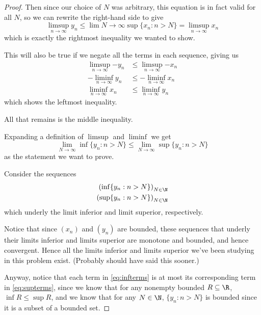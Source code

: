 \documentclass[11pt,letterpaper]{article}
\begin{document}
\begin{proof}
  Then since our choice of $N$ was arbitrary, this equation is in fact valid
  for all $N$, so we can rewrite the right-hand side to give
  \begin{equation*}
    \limsup_{n\to\infty} {y_n}
    \leq \lim{N\to\infty} \sup \{ x_n : n > N \}
    = \limsup_{n\to\infty} x_n
  \end{equation*}
  which is exactly the rightmost inequality we wanted to show.

  This will also be true if we negate all the terms in each sequence, giving us
  \begin{align*}
    \limsup_{n\to\infty}{-y_n} &\leq \limsup_{n\to\infty}{-x_n} \\
    -\liminf_{n\to\infty}{y_n} &\leq -\liminf_{n\to\infty}{x_n} \\
    \liminf_{n\to\infty}{x_n} &\leq \liminf_{n\to\infty}{y_n}
  \end{align*}
  which shows the leftmost inequality.

  All that remains is the middle inequality.

  Expanding a definition of $\limsup{}$ and $\liminf{}$ we get
  \begin{equation*}
    \lim_{N\to\infty} \inf \{ y_n : n > N \}
    \leq
    \lim_{N\to\infty} \sup \{ y_n : n > N \}
  \end{equation*}
  as the statement we want to prove.

  Consider the sequences
  \begin{align}
    \left( \inf \{ y_n : n > N \} \right)_{N \in \N} \label{eq:infterms} \\
    \left( \sup \{ y_n : n > N \} \right)_{N \in \N} \label{eq:supterms}
  \end{align}
  which underly the limit inferior and limit superior, respectively.

  Notice that since $(x_n)$ and $(y_n)$ are bounded, these sequences that
  underly their limits inferior and limits superior are monotone and bounded,
  and hence convergent. Hence all the limits inferior and limits superior we've
  been studying in this problem exist. (Probably should have said this sooner.)

  Anyway, notice that each term in \eqref{eq:infterms} is at most its
  corresponding term in \eqref{eq:supterms}, since we know that for any
  nonempty bounded $R \subseteq \R$, $\inf R \leq \sup R$, and we know that
  for any $N \in \N$, $\{ y_n : n > N \}$ is bounded since it is a subset of a
  bounded set.


\end{proof}
\end{document}
